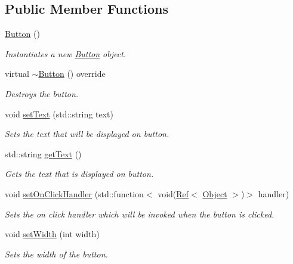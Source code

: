 \subsection*{Public Member Functions}
\begin{DoxyCompactItemize}
\item 
\mbox{\hyperlink{class_button_a3b36df1ae23c58aedb9e15a713159459}{Button}} ()
\begin{DoxyCompactList}\small\item\em Instantiates a new \mbox{\hyperlink{class_button}{Button}} object. \end{DoxyCompactList}\item 
virtual \mbox{\hyperlink{class_button_af051ff5b71d12edf514478a68a334d27}{$\sim$\+Button}} () override
\begin{DoxyCompactList}\small\item\em Destroys the button. \end{DoxyCompactList}\item 
void \mbox{\hyperlink{class_button_aad8dccffb2940c1c44d2e515d124143c}{set\+Text}} (std\+::string text)
\begin{DoxyCompactList}\small\item\em Sets the text that will be displayed on button. \end{DoxyCompactList}\item 
std\+::string \mbox{\hyperlink{class_button_afd57748d0bd0f5fa35d765052d281169}{get\+Text}} ()
\begin{DoxyCompactList}\small\item\em Gets the text that is displayed on button. \end{DoxyCompactList}\item 
void \mbox{\hyperlink{class_button_a05e05f2a1b0055dcaa69b231a52f86e4}{set\+On\+Click\+Handler}} (std\+::function$<$ void(\mbox{\hyperlink{class_ref}{Ref}}$<$ \mbox{\hyperlink{class_object}{Object}} $>$)$>$ handler)
\begin{DoxyCompactList}\small\item\em Sets the on click handler which will be invoked when the button is clicked. \end{DoxyCompactList}\item 
void \mbox{\hyperlink{class_button_ae1b9fb6d675b102d1b849d5707367e5c}{set\+Width}} (int width)
\begin{DoxyCompactList}\small\item\em Sets the width of the button. \end{DoxyCompactList}\item 

\end{DoxyCompactItemize}
